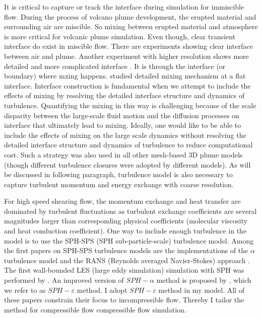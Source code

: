 It is critical to capture or track the interface during simulation for immiscible flow. During the process of volcano plume development, the erupted material and surrounding air are miscible. So mixing between erupted material and atmosphere is more critical for volcanic plume simulation. Even though, clear transient interface do exist in miscible flow. There are experiments \citep {papantoniou1989large} showing clear interface between air and plume. Another experiment with higher resolution shows more detailed and more complicated interface \cite{crimaldi2001high}. 
It is through the interface (or boundary) where mxing happens. \citet{jacobson2008mixing} studied detailed mixing mechanism at a flat interface. Interface construction is fundamental when we attempt to include the effects of mixing by resolving the detailed interface structure and dynamics of turbulence. Quantifying the mixing in this way is challenging because of the scale disparity between the large-scale fluid motion and the diffusion processes on interface that ultimately lead to mixing. Ideally, one would like to be able to include the effects of mixing on the large scale dynamics without resolving the detailed interface structure and dynamics of turbulence to reduce computational cost. Such a strategy was also used in all other mesh-based 3D plume models (though different turbulence closures were adopted by different models). As will be discussed in following paragraph, turbulence model is also necessary to capture turbulent momentum and energy exchange with coarse resolution.

For high speed shearing flow, the momentum exchange and heat transfer are dominated by turbulent fluctuations as turbulent exchange coefficients are several magnitudes larger than corresponding physical coefficients (molecular viscosity and heat conduction coefficient). 
One way to include enough turbulence in the model is to use the SPH-SPS (SPH sub-particle-scale) turbulence model.
Among the first papers on SPH-SPS turbulence models are the implementations of the $\alpha$ turbulence model \citep{holm1999fluctuation, monaghan2002sph} and the RANS (Reynolds averaged Navier-Stokes) approach \citep{violeau2007numerical}. The first wall-bounded LES (large eddy simulation) simulation with SPH was performed by \citet{issa2005numerical}. An improved version of $SPH-\alpha$ method  \citep{monaghan2002sph} is proposed by \citet{monaghan2011turbulence}, which we refer to as $SPH-\varepsilon$ method. I adopt $SPH-\varepsilon$ method in my model. All of these papers constrain their focus to incompressible flow. Thereby I tailor the method for compressible flow compressible flow simulation.

